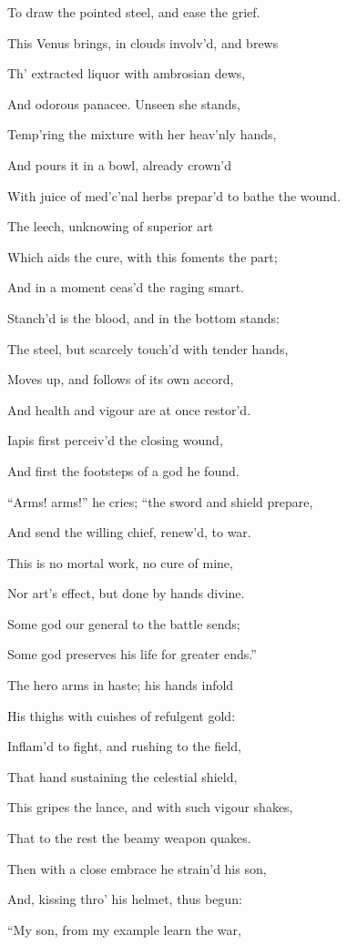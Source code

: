 To draw the pointed steel, and ease the grief.

This Venus brings, in clouds involv’d, and brews

Th’ extracted liquor with ambrosian dews,

And odorous panacee. Unseen she stands,

Temp’ring the mixture with her heav’nly hands,

And pours it in a bowl, already crown’d

With juice of med’c’nal herbs prepar’d to bathe the wound.

The leech, unknowing of superior art

Which aids the cure, with this foments the part;

And in a moment ceas’d the raging smart.

Stanch’d is the blood, and in the bottom stands:

The steel, but scarcely touch’d with tender hands,

Moves up, and follows of its own accord,

And health and vigour are at once restor’d.

Iapis first perceiv’d the closing wound,

And first the footsteps of a god he found.

“Arms! arms!” he cries; “the sword and shield prepare,

And send the willing chief, renew’d, to war.

This is no mortal work, no cure of mine,

Nor art’s effect, but done by hands divine.

Some god our general to the battle sends;

Some god preserves his life for greater ends.”

The hero arms in haste; his hands infold

His thighs with cuishes of refulgent gold:

Inflam’d to fight, and rushing to the field,

That hand sustaining the celestial shield,

This gripes the lance, and with such vigour shakes,

That to the rest the beamy weapon quakes.

Then with a close embrace he strain’d his son,

And, kissing thro’ his helmet, thus begun:

“My son, from my example learn the war,

